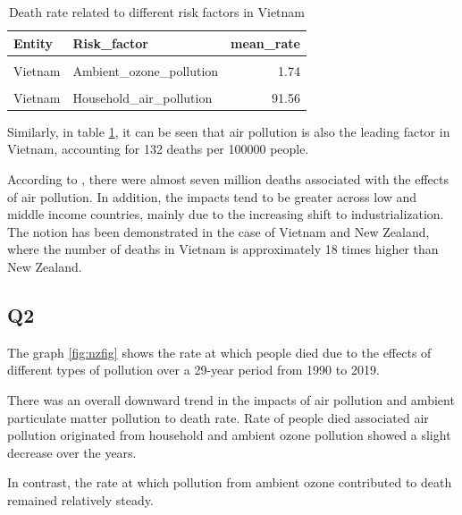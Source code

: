 \documentclass[11pt,a4paper,]{article}
\begin{document}
\begin{table}[!h]

\caption{\label{tab:vn}Death rate related to different risk factors in Vietnam}
\centering
\begin{tabular}[t]{llr}
\toprule
Entity & Risk\_factor & mean\_rate\\
\midrule
\cellcolor{gray!6}{Vietnam} & \cellcolor{gray!6}{Air\_pollution} & \cellcolor{gray!6}{131.61}\\
Vietnam & Ambient\_ozone\_pollution & 1.74\\
\cellcolor{gray!6}{Vietnam} & \cellcolor{gray!6}{Ambient\_particulate\_matter\_pollution} & \cellcolor{gray!6}{38.99}\\
Vietnam & Household\_air\_pollution & 91.56\\
\bottomrule
\end{tabular}
\end{table}

Similarly, in table \ref{tab:vn}, it can be seen that air pollution is also the leading factor in Vietnam, accounting for 132 deaths per 100000 people.

According to \textcite{mannucci2017health}, there were almost seven million deaths associated with the effects of air pollution. In addition, the impacts tend to be greater across low and middle income countries, mainly due to the increasing shift to industrialization. The notion has been demonstrated in the case of Vietnam and New Zealand, where the number of deaths in Vietnam is approximately 18 times higher than New Zealand.

\hypertarget{q2}{%
\subsection{Q2}\label{q2}}

The graph \ref{fig:nzfig} shows the rate at which people died due to the effects of different types of pollution over a 29-year period from 1990 to 2019.

There was an overall downward trend in the impacts of air pollution and ambient particulate matter pollution to death rate.
Rate of people died associated air pollution originated from household and ambient ozone pollution showed a slight decrease over the years.

In contrast, the rate at which pollution from ambient ozone contributed to death remained relatively steady.
\end{document}
